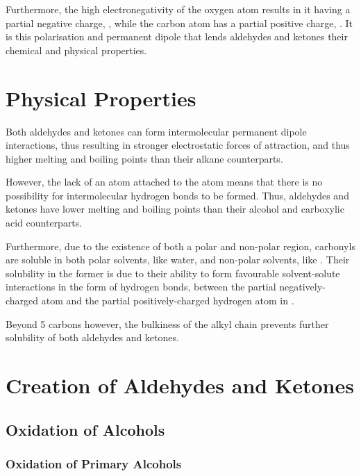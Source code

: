 			Furthermore, the high electronegativity of the oxygen atom results in it having a partial negative charge, \deltam, while the
			carbon atom has a partial positive charge, \deltap. It is this polarisation and permanent dipole that lends aldehydes and ketones
			their chemical and physical properties.



	\section{Physical Properties}

		Both aldehydes and ketones can form intermolecular permanent dipole interactions, thus resulting in stronger electrostatic forces
		of attraction, and thus higher melting and boiling points than their alkane counterparts.

		However, the lack of an  atom attached to the  atom means that there is no possibility for intermolecular hydrogen
		bonds to be formed. Thus, aldehydes and ketones have lower melting and boiling points than their alcohol and carboxylic acid
		counterparts.

		Furthermore, due to the existence of both a polar and non-polar region, carbonyls are soluble in both polar solvents, like water,
		and non-polar solvents, like . Their solubility in the former is due to their ability to form favourable
		solvent-solute interactions in the form of hydrogen bonds, between the partial negatively-charged  atom and the partial
		positively-charged hydrogen atom in .

		Beyond 5 carbons however, the bulkiness of the alkyl chain prevents further solubility of both aldehydes and ketones.


	\pagebreak
	\section{Creation of Aldehydes and Ketones}

		\subsection{Oxidation of Alcohols}

			\subsubsection{Oxidation of Primary Alcohols}

